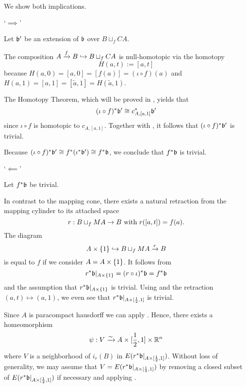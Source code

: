 \begin{myproof}
    We show both implications.

    `$\implies$'

    Let $\bb'$ be an extension of $\bb$ over $B \sqcup_f CA$.

    The composition $A \xrightarrow{f} B \hookrightarrow{} B \sqcup_f CA$ is
    null-homotopic via the homotopy
    \[ H(a, t) := [a, t] \]
    because $H(a, 0) = [a, 0] = [f(a)] = (\iota \circ f)(a)$
    and $H(a, 1) = [a, 1] = [\tilde{a}, 1] = H(\tilde{a}, 1)$.
    
    The Homotopy Theorem, which will be proved in ,
    yields that
    \[ \ind{(\iota \circ f)}\bb' \cong \ind{c_{A, [a, 1]}}\bb' \]
    since $\iota \circ f$ is homotopic to $c_{A, [a, 1]}$.
    Together with ,
    it follows that $\ind{(\iota \circ f)}\bb'$ is trivial.

    Because $\ind{(\iota \circ f)}\bb' \cong \ind{f}(\ind{\iota}\bb') \cong \ind{f}\bb$,
    we conclude that $\ind{f}\bb$ is trivial.

    `$\impliedby$'

    Let $\ind{f}\bb$ be trivial.

    In contrast to the mapping cone,
    there exists a natural retraction from the mapping cylinder to its attached space
    \[ r: B \sqcup_f MA \to B \text{ with } r([a, t]) = f(a). \]
    The diagram
    \[ A \times \{1\} \hookrightarrow{} B \sqcup_f MA \xrightarrow{r} B \]
    is equal to $f$ if we consider $A = A \times{} \{1\}$.
    It follows from
    \[ \ind{r}\bb[A \cross \{1\}] = \ind{(r \circ \iota)}\bb = \ind{f}\bb \]
    and the assumption that $\ind{r}\bb[A \cross \{1\}]$ is trivial.
    Using  and the retraction $(a, t) \mapsto (a, 1)$,
    we even see that $\ind{r}\bb[A \cross [\half, 1]]$ is trivial.

    Since $A$ is paracompact hausdorff we can apply .
    Hence, there exists a homeomorphism
    \[ \psi: V \xrightarrow{\sim} A \times [\frac{1}{2}, 1] \times \mathbb{R}^n \]
    where $V$ is a neighborhood of $i_r(B)$ in $E(\ind{r}\bb[A \cross [\half, 1]])$.
    Without loss of generality,
    we may assume that $V = E(\ind{r}\bb[A \cross [\half, 1]])$
    by removing a closed subset of $E(\ind{r}\bb[A \cross [\half, 1]])$
    if necessary and applying .


\end{myproof}
